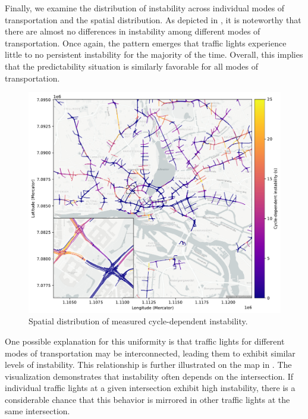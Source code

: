 Finally, we examine the distribution of instability across individual modes of transportation and the spatial distribution. As depicted in , it is noteworthy that there are almost no differences in instability among different modes of transportation. Once again, the pattern emerges that traffic lights experience little to no persistent instability for the majority of the time. Overall, this implies that the predictability situation is similarly favorable for all modes of transportation.

\begin{figure}[ht]
    \centering
    \includegraphics[width=\linewidth]{images/predictability-map.pdf}
    \caption{Spatial distribution of measured cycle-dependent instability.}\label{fig:predictability-map}
\end{figure}

One possible explanation for this uniformity is that traffic lights for different modes of transportation may be interconnected, leading them to exhibit similar levels of instability. This relationship is further illustrated on the map in . The visualization demonstrates that instability often depends on the intersection. If individual traffic lights at a given intersection exhibit high instability, there is a considerable chance that this behavior is mirrored in other traffic lights at the same intersection.


